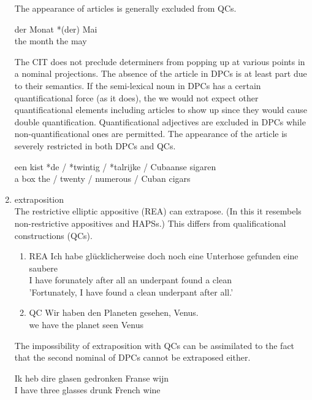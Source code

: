 \documentclass{article}
\begin{document}
\begin{enumerate}
The appearance of articles is generally excluded from QCs. 
\begin{example}
\label{}
   \gll der Monat *(der) Mai\\
the month the may\\

   \glt
   \glend
   \end{example}
The CIT does not preclude determiners from popping up at various points in a nominal projections. The absence of the article in DPCs is at least part due to their semantics. If the semi-lexical noun in DPCs has a certain quantificational force (as it does), the we would not expect other quantificational elements including articles to show up since they would cause double quantification. Quantificational adjectives are excluded in DPCs while non-quantificational ones are permitted. The appearance of the article is severely restricted in both DPCs and QCs. 
\begin{example}
\label{}
   \gll een kist *de / *twintig / *talrijke / Cubaanse sigaren\\
a box the / twenty / numerous / Cuban cigars\\

   \glt
   \glend
   \end{example}
\item extraposition\\
The restrictive elliptic appositive (REA) can extrapose. (In this it resembels non-restrictive appositives and HAPSs.) This differs from qualificational constructions (QCs).
\begin{example}
\label{}
\begin{enumerate}
\item REA 
 \gll Ich habe gl\"ucklicherweise doch noch eine Unterhose gefunden eine saubere\\
 I have forunately after all an underpant found a clean\\
 'Fortunately, I have found a clean underpant after all.'\\
\item QC
 \gll *Wir haben den Planeten gesehen, Venus.\\
 we have the planet seen Venus\\

   \glt
   \glend
\end{enumerate}
   \end{example}

The impossibility of extraposition with QCs can be assimilated to the fact that the second nominal of DPCs cannot be extraposed either.
\begin{example}
\label{}
   \gll *Ik heb dire glasen gedronken Franse wijn\\
I have three glasses drunk French wine\\


\end{example}
\end{enumerate}
\end{document}
